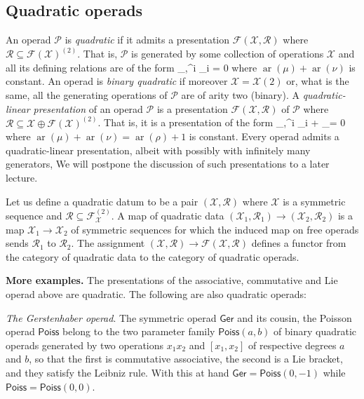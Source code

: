 \documentclass[fleqn,a4paper, twoside]{article}
\makeatletter
\newcommand{\0}{\langle 0\rangle}
\newcommand{\XX}{\mathcal{X}}
\newcommand{\RR}{\mathcal{R}}
\newcommand{\FF}{\mathcal{F}}
\newcommand{\ari}{\operatorname{ar}}
\let\[\@undefined
\DeclareRobustCommand{\[}{\begin{equation}}%
\let\]\@undefined
\DeclareRobustCommand{\]}{\end{equation}}%
\theoremstyle{mytheorem}
\theoremstyle{introthm}
\theoremstyle{mydefinition}
\theoremstyle{mydefinition2}
\theoremstyle{plain} %
\newcommand{\?}{\,?\,}
\newcommand{\PP}{{\mathcal{P}}}
\theoremstyle{mytheorem}
\theoremstyle{plain} %
\makeatother
\begin{document}
\subsection{Quadratic operads}
An operad $\PP$ is \emph{quadratic} if it admits a presentation
$\FF(\XX,\RR)$ where $\RR \subseteq \FF(\XX)^{(2)}$. 
That is, $\PP$ is generated by some collection of
operations $\XX$ and all its defining relations are of the form
\[ \sum \lambda_{\mu,\nu}^i \mu \circ_i \nu = 0  \] 
where $\ari(\mu)+\ari(\nu)$ is constant. An operad is
\emph{binary quadratic} if moreover $\XX = \XX(2)$ or,
what is the same, all the generating operations of $\PP$
are of arity two (binary). 
 A \emph{quadratic-linear presentation} of an operad $\PP$
is a presentation $\FF(\XX,\RR)$ of $\PP$ where $\RR 
\subseteq \XX \oplus \FF(\XX)^{(2)}$. That is, it is
a presentation of the form
\[ \sum \lambda_{\mu,\nu}^i \mu \circ_i \nu 
 + \sum \lambda_\rho \rho = 0   \] 
 where $\ari(\mu)+\ari(\nu) = \ari(\rho)+1$ is constant.
 Every operad admits a quadratic-linear
presentation, albeit with possibly with infinitely many generators, 
We will postpone the discussion of such presentations
to a later lecture.
 
 Let us define a quadratic datum to be a pair $(\XX,\RR)$
 where $\XX$ is a symmetric sequence and $\RR\subseteq
 \FF_\XX^{(2)}$. A map of quadratic data $(\XX_1,\RR_1) 
 \longrightarrow (\XX_2,\RR_2)$ is a map $\XX_1
 \to \XX_2$ of symmetric sequences for which the induced
 map on free operads sends $\RR_1$ to $\RR_2$. The 
 assignment $(\XX,\RR) \longrightarrow \FF(\XX,\RR)$
 defines a functor from the category of quadratic data
 to the category of quadratic operads.
 
 \bigskip
 
\textbf{More examples.} The presentations of the 
associative, commutative and Lie operad above are
quadratic. The following are also quadratic operads:

\emph{The Gerstenhaber operad}. The symmetric operad
$\mathsf{Ger}$ and its cousin,
the Poisson operad $\mathsf{Poiss}$ belong to the two parameter
family $\mathsf{Poiss}(a,b)$ of binary quadratic operads generated
by two operations $x_1x_2$ and $[x_1,x_2]$ of respective degrees
$a$ and $b$, so that
the first is commutative associative, the second is a Lie
bracket, and they satisfy the Leibniz rule. With this
at hand $\mathsf{Ger} =\mathsf{Poiss}(0,-1)$ while  
$\mathsf{Poiss} = \mathsf{Poiss}(0,0)$.

\smallskip
\end{document}
